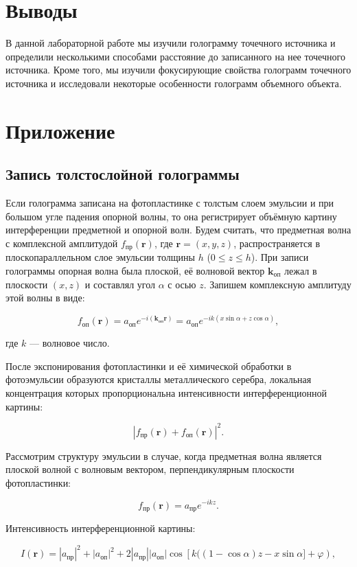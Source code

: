 \documentclass[a4paper,12pt]{article}
\begin{document}
\section{Выводы}
В данной лабораторной работе мы изучили голограмму точечного источника и определили несколькими способами расстояние до записанного на нее точечного источника. Кроме того, мы изучили фокусирующие свойства голограмм точечного источника и исследовали некоторые особенности голограмм объемного объекта.

\section{Приложение}

\subsection{Запись толстослойной голограммы}
Если голограмма записана на фотопластинке с толстым слоем эмульсии и при большом угле падения опорной волны, то она регистрирует объёмную картину интерференции предметной и опорной волн. Будем считать, что предметная волна с комплексной амплитудой $f_{\text{пр}}(\mathbf{r})$, где $\mathbf{r} = (x, y, z)$, распространяется в плоскопараллельном слое эмульсии толщины $h$ ($0 \leq z \leq h$). При записи голограммы опорная волна была плоской, её волновой вектор $\mathbf{k}_{\text{оп}}$ лежал в плоскости $(x, z)$ и составлял угол $\alpha$ с осью $z$. Запишем комплексную амплитуду этой волны в виде:

$$
f_{\text{оп}}(\mathbf{r}) = a_{\text{оп}} e^{-i(\mathbf{k}_{\text{оп}} \mathbf{r})} = a_{\text{оп}} e^{-ik(x \sin \alpha + z \cos \alpha)},
$$

где $k$ — волновое число.

После экспонирования фотопластинки и её химической обработки в фотоэмульсии образуются кристаллы металлического серебра, локальная концентрация которых пропорциональна интенсивности интерференционной картины:

$$
|f_{\text{пр}}(\mathbf{r}) + f_{\text{оп}}(\mathbf{r})|^2.
$$

Рассмотрим структуру эмульсии в случае, когда предметная волна является плоской волной с волновым вектором, перпендикулярным плоскости фотопластинки:

$$
f_{\text{пр}}(\mathbf{r}) = a_{\text{пр}} e^{-ikz}.
$$

Интенсивность интерференционной картины:

$$
I(\mathbf{r}) = |a_{\text{пр}}|^2 + |a_{\text{оп}}|^2 + 2|a_{\text{пр}}||a_{\text{оп}}|\cos\left[k((1 - \cos\alpha)z - x \sin\alpha] + \varphi\right),
$$
\end{document}
